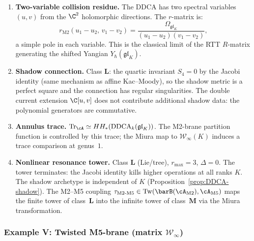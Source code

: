 \begin{computation}
\begin{enumerate}[label=\textup{(\roman*)},nosep]
\item \textbf{Two-variable collision residue.}
 The DDCA has two spectral variables $(u,v)$ from the
 $\C^2$ holomorphic directions. The $r$-matrix is:
 \begin{equation}\label{eq:platonic-r-M2}
 r_{\mathrm{M2}}(u_1 - u_2,\, v_1 - v_2)
 = \frac{\Omega_{\mathfrak{gl}_K}}{(u_1 - u_2)(v_1 - v_2)},
 \end{equation}
 a simple pole in each variable. This is the classical limit of
 the RTT $R$-matrix generating the shifted Yangian
 $Y_\hbar(\mathfrak{gl}_K)$.

\item \textbf{Shadow connection.}
 Class $\mathbf{L}$: the quartic invariant $S_4 = 0$
 by the Jacobi identity (same mechanism as affine Kac--Moody),
 so the shadow metric is a perfect square and the connection
 has regular singularities. The double current extension
 $\C[u,v]$ does not contribute additional shadow data: the
 polynomial generators are commutative.

\item \textbf{Annulus trace.}
 $\mathrm{Tr}_\cA \simeq HH_*(\mathrm{DDCA}_k(\mathfrak{gl}_K))$.
 The M2-brane partition function is controlled by this trace;
 the Miura map to $\mathcal{W}_\infty(K)$ induces a trace
 comparison at genus~$1$.

\item \textbf{Nonlinear resonance tower.}
 Class $\mathbf{L}$ (Lie/tree), $r_{\max} = 3$,
 $\Delta = 0$. The tower terminates: the Jacobi identity
 kills higher operations at all ranks $K$. The shadow archetype
 is independent of $K$
 \textup{(}Proposition~\textup{\ref{prop:DDCA-shadow}}\textup{)}.
 The M2--M5 coupling
 $\tau_{\mathrm{M2\text{-}M5}} \in \operatorname{Tw}(\barB(\cA_{\mathrm{M2}}), \cA_{\mathrm{M5}})$
 maps the finite tower of class~$\mathbf{L}$ into the infinite
 tower of class~$\mathbf{M}$ via the Miura transformation.
\end{enumerate}
\end{computation}


\subsubsection{Example V: Twisted M5-brane (matrix \texorpdfstring{$\mathcal{W}_\infty$}{W-infinity})}
\label{subsubsec:platonic-M5}

